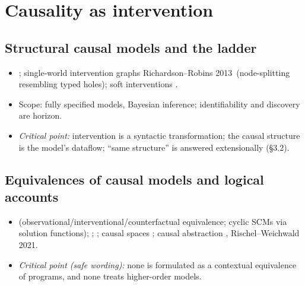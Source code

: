 \documentclass[11pt,a4paper]{article}
\newif\ifskeletonnotes
\newcommand{\budget}[1]{\ifskeletonnotes{\small\color{red!60!black}\textbf{(\textasciitilde#1 words)}}\fi}
\newcommand{\sknew}[1]{\ifskeletonnotes{\color{purple!70!black}[NEW: #1]}\else#1\fi}
\newcommand{\skim}{\ifskeletonnotes{\color{purple!70!black}[SKIM]}\fi}
\begin{document}
\section{Causality as intervention}\budget{1000}
\subsection{Structural causal models and the ladder}\budget{250}
\begin{itemize}[nosep]
\item \cite{pearl2009causality,Pearl2018_book_of_why,bareinboim:etal20,rubin1974,ibeling2023comparing,Balke1994}; single-world intervention graphs \sknew{Richardson--Robins 2013}\skim\ (node-splitting resembling typed holes); soft interventions \cite{dawid2002_stoch_intv,didelez2006_stoch_mech_intv,Eberhardt_Scheines_2007,levis2024stochasticinterventionssensitivityanalysis}.
\item Scope: fully specified models, Bayesian inference; identifiability \cite{JMLR:v9:shpitser08a,shpitser2012counterfactualstested} and discovery \cite{spirtes2000causation,peters_janzing_schoelkopf_2017_book} are horizon.
\item \emph{Critical point:} intervention is a syntactic transformation; the causal structure is the model's dataflow; ``same structure'' is answered extensionally (\S3.2).
\end{itemize}
\subsection{Equivalences of causal models and logical accounts}\budget{250}
\begin{itemize}[nosep]
\item \cite{Bongers_2021} (observational/interventional/counterfactual equivalence; cyclic SCMs via solution functions); \cite{verma1990equivalence}; \cite{ibeling2020hierarchy,icard2017programs,ibeling2019openuniverse}; causal spaces \cite{park2024measuretheoreticaxiomatisationcausality,buchholz2024products}; causal abstraction \cite{rubenstein2017consistency,beckers2019abstracting,lorenztull2026abstraction,englberger2025causalabstractionscategoricallyunified}, \sknew{Rischel--Weichwald 2021}.
\item \emph{Critical point (safe wording):} none is formulated as a contextual equivalence of programs, and none treats higher-order models.
\end{itemize}
\end{document}
